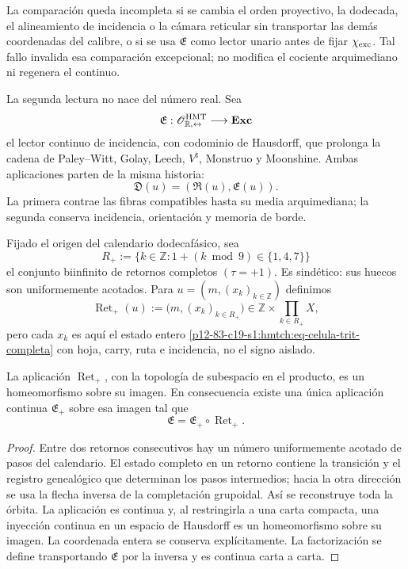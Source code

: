 \begin{falsifier}
La comparación queda incompleta si se cambia el orden proyectivo, la dodecada,
el alineamiento de incidencia o la cámara reticular sin transportar las demás
coordenadas del calibre, o si se usa \(\mathfrak E\) como lector unario antes
de fijar \(\chi_{\rm exc}\). Tal fallo invalida esa comparación excepcional;
no modifica el cociente arquimediano ni regenera el continuo.
\end{falsifier}


La segunda lectura no nace del número real. Sea
\[
 \mathfrak E:
 \mathscr O_{\mathbb R,\leftrightarrow}^{\rm HMT}
 \longrightarrow\mathbf{Exc}
\]
el lector continuo de incidencia, con codominio de Hausdorff, que prolonga
la cadena de Paley--Witt, Golay,
Leech, \(V^\natural\), Monstruo y Moonshine. Ambas aplicaciones parten de
la misma historia:
\begin{equation}
 \mathfrak D(u)=(\mathfrak R(u),\mathfrak E(u)).
 \label{p12-83-c17-s7:hmtch:eq-doble-proyeccion-two-way}
\end{equation}
La primera contrae las fibras compatibles hasta su media arquimediana; la
segunda conserva incidencia, orientación y memoria de borde.

Fijado el origen del calendario dodecafásico, sea
\[
 R_+:=\{k\in\mathbb Z:1+(k\bmod 9)\in\{1,4,7\}\}
\]
el conjunto biinfinito de retornos completos \((\tau=+1)\). Es sindético:
sus huecos son uniformemente acotados. Para
\(u=(m,(x_k)_{k\in\mathbb Z})\) definimos
\[
 \operatorname{Ret}_+(u)
 :=\bigl(m,(x_k)_{k\in R_+}\bigr)
 \in\mathbb Z\times\prod_{k\in R_+}X,
\]
pero cada \(x_k\) es aquí el estado entero
\eqref{p12-83-c19-s1:hmtch:eq-celula-trit-completa} con hoja, carry, ruta e incidencia,
no el signo aislado.

\begin{proposition}
\label{p12-83-c17-s7:hmtch:prop-retorno-reconstruye}
La aplicación \(\operatorname{Ret}_+\), con la topología de subespacio en el
producto, es un homeomorfismo sobre su imagen.
En consecuencia existe una única aplicación continua
\(\mathfrak E_+\) sobre esa imagen tal que
\begin{equation}
 \mathfrak E=\mathfrak E_+\circ\operatorname{Ret}_+.
 \label{p12-83-c17-s7:hmtch:eq-factorizacion-excepcional-retorno}
\end{equation}
\end{proposition}

\begin{proof}
Entre dos retornos consecutivos hay un número uniformemente acotado de pasos
del calendario. El estado completo en un retorno contiene la transición y
el registro genealógico que determinan los pasos intermedios; hacia la otra dirección se
usa la flecha inversa de la completación grupoidal. Así se reconstruye toda
la órbita. La aplicación es continua y, al restringirla a una carta
compacta, una inyección continua en un espacio de Hausdorff es un
homeomorfismo sobre su imagen. La coordenada entera se conserva
explícitamente. La factorización se define transportando \(\mathfrak E\) por
la inversa y es continua carta a carta.
\end{proof}

